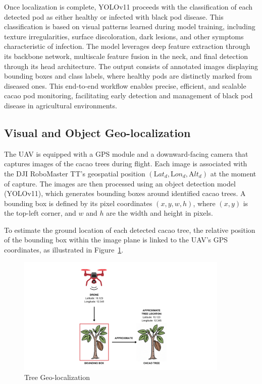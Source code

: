 Once localization is complete, YOLOv11 proceeds with the classification of each detected pod as either healthy or infected with black pod disease. This classification is based on visual patterns learned during model training, including texture irregularities, surface discoloration, dark lesions, and other symptoms characteristic of infection. The model leverages deep feature extraction through its backbone network, multiscale feature fusion in the neck, and final detection through its head architecture. The output consists of annotated images displaying bounding boxes and class labels, where healthy pods are distinctly marked from diseased ones. This end-to-end workflow enables precise, efficient, and scalable cacao pod monitoring, facilitating early detection and management of black pod disease in agricultural environments.


\subsection*{Visual and Object Geo-localization}

The UAV is equipped with a GPS module and a downward-facing camera that captures images of the cacao trees during flight. Each image is associated with the DJI RoboMaster TT’s geospatial position $(\text{L}at_d, \text{L}on_d, \text{A}lt_d)$ at the moment of capture. The images are then processed using an object detection model (YOLOv11), which generates bounding boxes around identified cacao trees. A bounding box is defined by its pixel coordinates $(x, y, w, h)$, where $(x, y)$ is the top-left corner, and $w$ and $h$ are the width and height in pixels.

To estimate the ground location of each detected cacao tree, the relative position of the bounding box within the image plane is linked to the UAV’s GPS coordinates, as illustrated in Figure~\ref{fig:tree}.

\begin{figure}[H]
	\centering
	\caption{Tree Geo-localization}
	\label{fig:tree}
	\includegraphics[width=0.9\textwidth]{figures/Tree Geolocalization.pdf}
\end{figure}

